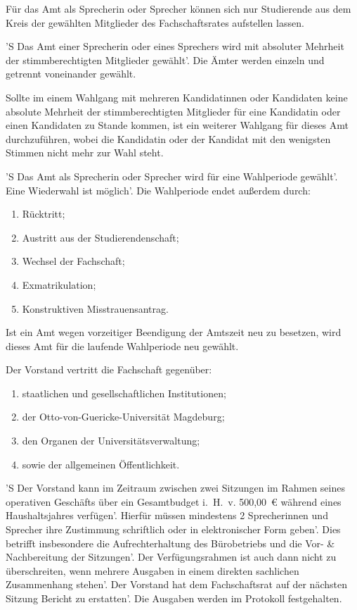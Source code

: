 \documentclass[%
	parskip=half,
]{scrartcl}
\begin{document}
\begin{contract}
Für das Amt als Sprecherin oder Sprecher können sich nur Studierende aus dem Kreis der gewählten Mitglieder des
Fachschaftsrates aufstellen lassen.


'S Das Amt einer Sprecherin oder eines Sprechers wird mit absoluter Mehrheit der stimmberechtigten Mitglieder gewählt'.
Die Ämter werden einzeln und getrennt voneinander gewählt.

Sollte im einem Wahlgang mit mehreren Kandidatinnen oder Kandidaten keine absolute Mehrheit der stimmberechtigten
Mitglieder für eine Kandidatin oder einen Kandidaten zu Stande kommen, ist ein weiterer Wahlgang für dieses Amt
durchzuführen, wobei die Kandidatin oder der Kandidat mit den wenigsten Stimmen nicht mehr zur Wahl steht.

'S Das Amt als Sprecherin oder Sprecher wird für eine Wahlperiode gewählt'. Eine Wiederwahl ist möglich'. Die
Wahlperiode endet außerdem durch:
\begin{enumerate}[\qquad a)]
	\item Rücktritt;
	\item Austritt aus der Studierendenschaft;
	\item Wechsel der Fachschaft;
	\item Exmatrikulation;
	\item Konstruktiven Misstrauensantrag.
\end{enumerate}

Ist ein Amt wegen vorzeitiger Beendigung der Amtszeit neu zu besetzen, wird dieses Amt für die laufende Wahlperiode neu 
gewählt.


Der Vorstand vertritt die Fachschaft gegenüber:
\begin{enumerate}[\qquad a)]
	\item staatlichen und gesellschaftlichen Institutionen;
	\item der Otto-von-Guericke-Universität Magdeburg;
	\item den Organen der Universitätsverwaltung;
	\item sowie der allgemeinen Öffentlichkeit.
\end{enumerate}

'S Der Vorstand kann im Zeitraum zwischen zwei Sitzungen im Rahmen seines operativen Geschäfts über ein Gesamtbudget
i.~H.~v. 500,00~€ während eines Haushaltsjahres verfügen'. Hierfür müssen mindestens 2 Sprecherinnen und Sprecher ihre
Zustimmung schriftlich oder in elektronischer Form geben'. Dies betrifft insbesondere die Aufrechterhaltung des
Bürobetriebs und die Vor- \& Nachbereitung der Sitzungen'. Der Verfügungsrahmen ist auch dann nicht zu überschreiten,
wenn mehrere Ausgaben in einem direkten sachlichen Zusammenhang stehen'. Der Vorstand hat dem Fachschaftsrat auf der
nächsten Sitzung Bericht zu erstatten'. Die Ausgaben werden im Protokoll festgehalten.


\end{contract}
\end{document}
